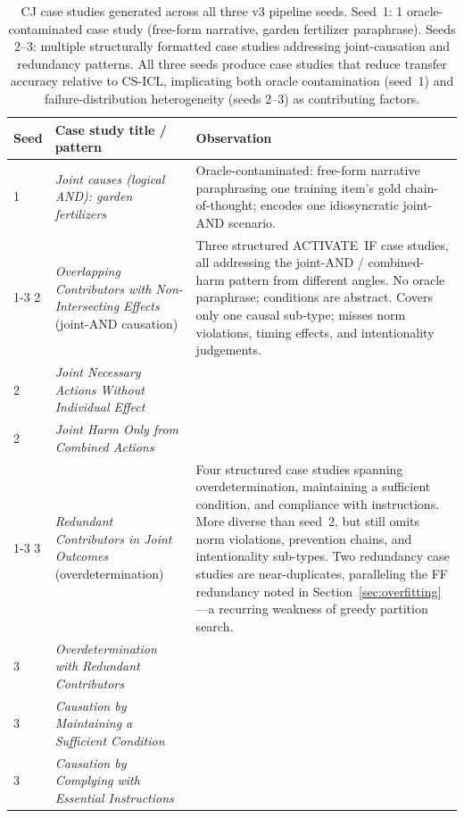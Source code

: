 \documentclass{article}
\begin{document}
\begin{table}[h]
  \caption{CJ case studies generated across all three v3 pipeline seeds.
    Seed~1: 1 oracle-contaminated case study (free-form narrative, garden fertilizer paraphrase).
    Seeds 2--3: multiple structurally formatted case studies addressing joint-causation and
    redundancy patterns.
    All three seeds produce case studies that reduce transfer accuracy relative to CS-ICL,
    implicating both oracle contamination (seed~1) and failure-distribution heterogeneity
    (seeds 2--3) as contributing factors.}
  \label{tab:cj_casestudies}
  \centering
  \smallskip
  \setlength{\tabcolsep}{5pt}
  \begin{tabular}{@{}p{0.7cm} p{5.4cm} p{5.4cm}@{}}
    \toprule
    \textbf{Seed} & \textbf{Case study title / pattern} & \textbf{Observation} \\
    \midrule
    1 &
      \textit{Joint causes (logical AND): garden fertilizers} &
      Oracle-contaminated: free-form narrative paraphrasing one training item's
      gold chain-of-thought; encodes one idiosyncratic joint-AND scenario. \\[4pt]
    \cmidrule(lr){1-3}
    2 &
      \textit{Overlapping Contributors with Non-Intersecting Effects} (joint-AND causation) &
      \multicolumn{1}{p{5.4cm}}{Three structured ACTIVATE~IF case studies, all
      addressing the joint-AND / combined-harm pattern from different angles.
      No oracle paraphrase; conditions are abstract. Covers only one causal sub-type;
      misses norm violations, timing effects, and intentionality judgements.} \\[2pt]
    2 & \textit{Joint Necessary Actions Without Individual Effect} & \\[2pt]
    2 & \textit{Joint Harm Only from Combined Actions} & \\[4pt]
    \cmidrule(lr){1-3}
    3 &
      \textit{Redundant Contributors in Joint Outcomes} (overdetermination) &
      \multicolumn{1}{p{5.4cm}}{Four structured case studies spanning overdetermination,
      maintaining a sufficient condition, and compliance with instructions.
      More diverse than seed~2, but still omits norm violations, prevention chains,
      and intentionality sub-types. Two redundancy case studies are near-duplicates,
      paralleling the FF redundancy noted in Section~\ref{sec:overfitting}---a recurring
      weakness of greedy partition search.} \\[2pt]
    3 & \textit{Overdetermination with Redundant Contributors} & \\[2pt]
    3 & \textit{Causation by Maintaining a Sufficient Condition} & \\[2pt]
    3 & \textit{Causation by Complying with Essential Instructions} & \\
    \bottomrule
  \end{tabular}
\end{table}
\end{document}
